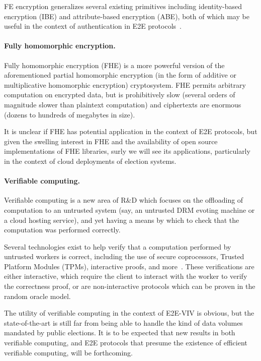 FE encryption generalizes several existing primitives including
identity-based encryption (IBE) and attribute-based encryption (ABE),
both of which may be useful in the context of authentication in E2E
protocols~\cite{IBE,ABE}.

\paragraph{Fully homomorphic encryption.} Fully homomorphic encryption
(FHE) is a more powerful version of the aforementioned partial
homomorphic encryption (in the form of additive or multiplicative
homomorphic encryption) cryptosystem.  FHE permits arbitrary
computation on encrypted data, but is prohibitively slow (several
orders of magnitude slower than plaintext computation) and ciphertexts
are enormous (dozens to hundreds of megabytes in size).  

It is unclear if FHE has potential application in the context of E2E
protocols, but given the swelling interest in FHE and the availability
of open source implementations of FHE libraries, surly we will see its
applications, particularly in the context of cloud deployments of
election systems.

\paragraph{Verifiable computing.} Verifiable computing is a new area
of R\&D which focuses on the offloading of computation to an untrusted
system (say, an untrusted DRM evoting machine or a cloud hosting
service), and yet having a means by which to check that the
computation was performed correctly.

Several technologies exist to help verify that a computation performed
by untrusted workers is correct, including the use of secure
coprocessors, Trusted Platform Modules (TPMs), interactive proofs, and
more~\cite{TPM-stuff}. These verifications are either interactive,
which require the client to interact with the worker to verify the
correctness proof, or are non-interactive protocols which can be
proven in the random oracle model.

The utility of verifiable computing in the context of E2E-VIV is
obvious, but the state-of-the-art is still far from being able to
handle the kind of data volumes mandated by public elections. It is to
be expected that new results in both verifiable computing, and E2E
protocols that presume the existence of efficient verifiable
computing, will be forthcoming.

